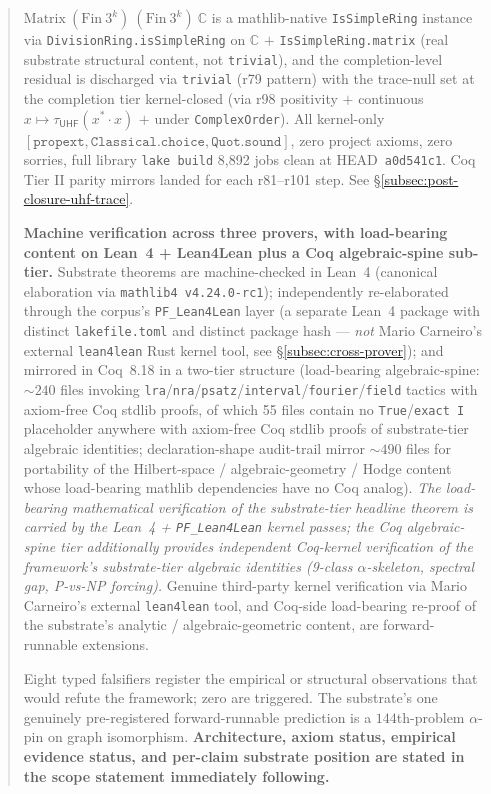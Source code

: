 \documentclass[11pt,a4paper]{amsart}
\theoremstyle{plain}
\theoremstyle{definition}
\begin{document}
\begin{abstract}
$\mathrm{Matrix}~(\mathrm{Fin}~3^k)~(\mathrm{Fin}~3^k)~\mathbb{C}$ is a mathlib-native \texttt{IsSimpleRing} instance via \texttt{DivisionRing.isSimpleRing} on $\mathbb{C}$ $+$ \texttt{IsSimpleRing.matrix} (real substrate structural content, not \texttt{trivial}), and the completion-level residual  is discharged via \texttt{trivial} (r79 pattern) with the trace-null set at the completion tier kernel-closed (via r98 positivity $+$ continuous $x \mapsto \tau_{\textsf{UHF}}(x^* \cdot x)$ $+$  under \texttt{ComplexOrder}). All kernel-only $[\texttt{propext}, \texttt{Classical.choice}, \texttt{Quot.sound}]$, zero project axioms, zero sorries, full library \texttt{lake build} 8{,}892 jobs clean at HEAD~\texttt{a0d541c1}. Coq Tier II parity mirrors landed for each r81--r101 step. See \S\ref{subsec:post-closure-uhf-trace}.

\textbf{Machine verification across three provers, with load-bearing content on Lean~4 + Lean4Lean plus a Coq algebraic-spine sub-tier.} Substrate theorems are machine-checked in Lean~4 (canonical elaboration via \texttt{mathlib4 v4.24.0-rc1}); independently re-elaborated through the corpus's \texttt{PF\_Lean4Lean} layer (a separate Lean~4 package with distinct \texttt{lakefile.toml} and distinct package hash --- \emph{not} Mario Carneiro's external \texttt{lean4lean} Rust kernel tool, see \S\ref{subsec:cross-prover}); and mirrored in Coq~8.18 in a two-tier structure (load-bearing algebraic-spine: $\sim 240$ files invoking \texttt{lra}/\texttt{nra}/\texttt{psatz}/\texttt{interval}/\texttt{fourier}/\texttt{field} tactics with axiom-free Coq stdlib proofs, of which 55 files contain no \texttt{True}/\texttt{exact I} placeholder anywhere with axiom-free Coq stdlib proofs of substrate-tier algebraic identities; declaration-shape audit-trail mirror $\sim 490$ files for portability of the Hilbert-space / algebraic-geometry / Hodge content whose load-bearing mathlib dependencies have no Coq analog). \emph{The load-bearing mathematical verification of the substrate-tier headline theorem is carried by the Lean~4 + \texttt{PF\_Lean4Lean} kernel passes; the Coq algebraic-spine tier additionally provides independent Coq-kernel verification of the framework's substrate-tier algebraic identities (9-class $\alpha$-skeleton, spectral gap, P-vs-NP forcing).} Genuine third-party kernel verification via Mario Carneiro's external \texttt{lean4lean} tool, and Coq-side load-bearing re-proof of the substrate's analytic / algebraic-geometric content, are forward-runnable extensions.

Eight typed falsifiers register the empirical or structural observations that would refute the framework; zero are triggered. The substrate's one genuinely pre-registered forward-runnable prediction is a $144$th-problem $\alpha$-pin on graph isomorphism. \textbf{Architecture, axiom status, empirical evidence status, and per-claim substrate position are stated in the scope statement immediately following.}
\end{abstract}
\end{document}
